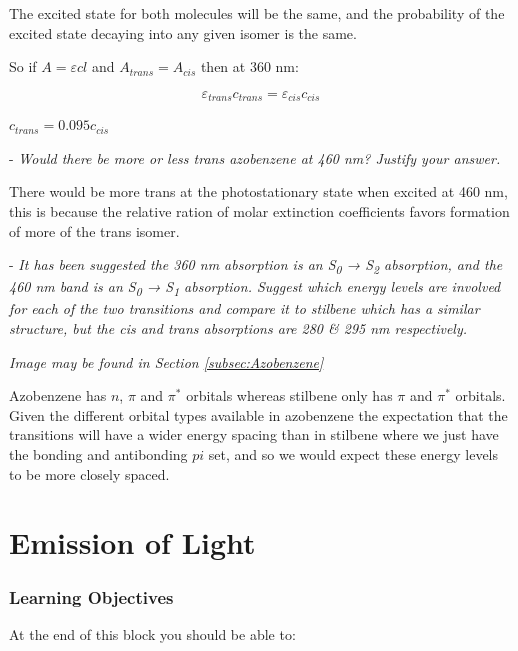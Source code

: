 \documentclass[
]{book}
\begin{document}
The excited state for both molecules will be the same, and the probability of the excited state decaying into any given isomer is the same.

So if \(A =\varepsilon cl\) and \(A_{trans}=A_{cis}\) then at 360 nm:

\begin{equation*}
\varepsilon_{trans} c_{trans} = \varepsilon_{cis} c_{cis}
\end{equation*}

\(c_{trans}= 0.095 c_{cis}\)

- \emph{Would there be more or less trans azobenzene at 460 nm? Justify your answer.}

There would be more trans at the photostationary state when excited at 460 nm, this is because the relative ration of molar extinction coefficients favors formation of more of the trans isomer.

- \emph{It has been suggested the 360 nm absorption is an S\textsubscript{0} → S\textsubscript{2} absorption, and the 460 nm band is an S\textsubscript{0} → S\textsubscript{1} absorption. Suggest which energy levels are involved for each of the two transitions and compare it to stilbene which has a similar structure, but the cis and trans absorptions are 280 \& 295 nm respectively.}

\emph{Image may be found in Section \ref{subsec:Azobenzene}}

Azobenzene has \(n\), \(\pi\) and \(\pi^*\) orbitals whereas stilbene only has \(\pi\) and \(\pi^*\) orbitals. Given the different orbital types available in azobenzene the expectation that the transitions will have a wider energy spacing than in stilbene where we just have the bonding and antibonding \(pi\) set, and so we would expect these energy levels to be more closely spaced.

\hypertarget{ch:Em}{%
\chapter{Emission of Light}\label{ch:Em}}

\hypertarget{sec:EmLOs}{%
\subsection{Learning Objectives}\label{sec:EmLOs}}

At the end of this block you should be able to:
\end{document}
